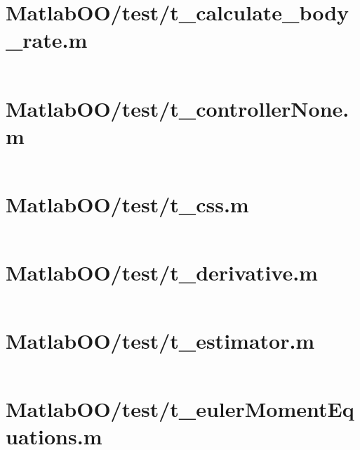 \pagebreak
\section{MatlabOO/test/t\_calculate\_body\_rate.m}\label{code:MatlabOO/test/t_calculate_body_rate.m}
\inputminted[linenos,fontsize=\scriptsize]{matlab}{/home/dcouture/git/mathyourlife/TSatPy/beta_versions/matlab_object_oriented/test/t_calculate_body_rate.m}

\pagebreak
\section{MatlabOO/test/t\_controllerNone.m}\label{code:MatlabOO/test/t_controllerNone.m}
\inputminted[linenos,fontsize=\scriptsize]{matlab}{/home/dcouture/git/mathyourlife/TSatPy/beta_versions/matlab_object_oriented/test/t_controllerNone.m}

\pagebreak
\section{MatlabOO/test/t\_css.m}\label{code:MatlabOO/test/t_css.m}
\inputminted[linenos,fontsize=\scriptsize]{matlab}{/home/dcouture/git/mathyourlife/TSatPy/beta_versions/matlab_object_oriented/test/t_css.m}

\pagebreak
\section{MatlabOO/test/t\_derivative.m}\label{code:MatlabOO/test/t_derivative.m}
\inputminted[linenos,fontsize=\scriptsize]{matlab}{/home/dcouture/git/mathyourlife/TSatPy/beta_versions/matlab_object_oriented/test/t_derivative.m}

\pagebreak
\section{MatlabOO/test/t\_estimator.m}\label{code:MatlabOO/test/t_estimator.m}
\inputminted[linenos,fontsize=\scriptsize]{matlab}{/home/dcouture/git/mathyourlife/TSatPy/beta_versions/matlab_object_oriented/test/t_estimator.m}

\pagebreak
\section{MatlabOO/test/t\_eulerMomentEquations.m}\label{code:MatlabOO/test/t_eulerMomentEquations.m}
\inputminted[linenos,fontsize=\scriptsize]{matlab}{/home/dcouture/git/mathyourlife/TSatPy/beta_versions/matlab_object_oriented/test/t_eulerMomentEquations.m}

